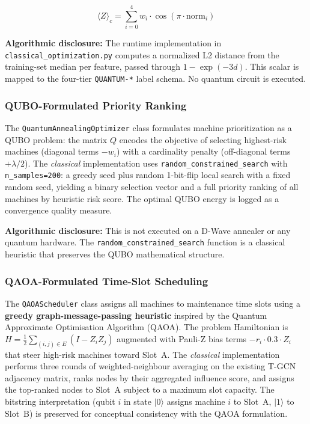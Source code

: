 \begin{equation}
    \langle Z \rangle_c = \sum_{i=0}^{4} w_i \cdot \cos(\pi \cdot \mathrm{norm}_i)
    \label{eq:composite_z}
\end{equation}

\textbf{Algorithmic disclosure:} The runtime implementation in \texttt{classical\_optimization.py} computes a normalized L2 distance from the training-set median per feature, passed through $1 - \exp(-3d)$. This scalar is mapped to the four-tier \texttt{QUANTUM-*} label schema. No quantum circuit is executed.

\subsubsection{QUBO-Formulated Priority Ranking}

The \texttt{QuantumAnnealingOptimizer} class formulates machine prioritization as a QUBO problem: the matrix $Q$ encodes the objective of selecting highest-risk machines (diagonal terms $-w_i$) with a cardinality penalty (off-diagonal terms $+\lambda/2$). The \emph{classical} implementation uses \texttt{random\_constrained\_search} with \texttt{n\_samples=200}: a greedy seed plus random 1-bit-flip local search with a fixed random seed, yielding a binary selection vector and a full priority ranking of all machines by heuristic risk score. The optimal QUBO energy is logged as a convergence quality measure.

\textbf{Algorithmic disclosure:} This is not executed on a D-Wave annealer or any quantum hardware. The \texttt{random\_constrained\_search} function is a classical heuristic that preserves the QUBO mathematical structure.

\subsubsection{QAOA-Formulated Time-Slot Scheduling}

The \texttt{QAOAScheduler} class assigns all machines to maintenance time slots using a \textbf{greedy graph-message-passing heuristic} inspired by the Quantum Approximate Optimisation Algorithm (QAOA). The problem Hamiltonian is $H = \frac{1}{2}\sum_{(i,j) \in E}(I - Z_i Z_j)$ augmented with Pauli-Z bias terms $-r_i \cdot 0.3 \cdot Z_i$ that steer high-risk machines toward Slot~A. The \emph{classical} implementation performs three rounds of weighted-neighbour averaging on the existing T-GCN adjacency matrix, ranks nodes by their aggregated influence score, and assigns the top-ranked nodes to Slot~A subject to a maximum slot capacity. The bitstring interpretation (qubit $i$ in state $|0\rangle$ assigns machine $i$ to Slot~A, $|1\rangle$ to Slot~B) is preserved for conceptual consistency with the QAOA formulation.


